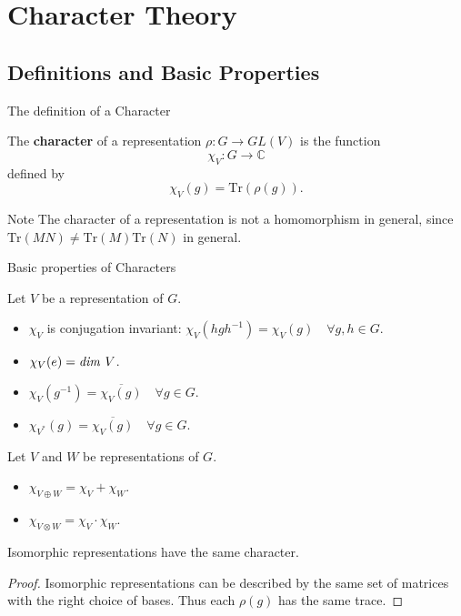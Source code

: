 \section{Character Theory}
\subsection{Definitions and Basic Properties}
\begin{frame}{The definition of a Character}
\begin{definition}
The \textbf{character} of a representation $\rho \colon G \to GL(V)$ is the function \[ \chi_V \colon G \to \mathbb{C}\] defined by \[\chi_V(g) = \text{Tr}(\rho(g)).\]
\end{definition}
\begin{block}{Note}
The character of a representation is not a homomorphism in general, since $\text{Tr}(MN) \neq \text{Tr}(M) \text{Tr}(N)$ in general.
\end{block}
\end{frame}

\begin{frame}{Basic properties of Characters}
\begin{proposition}
Let $V$ be a representation of $G$.
\begin{itemize}
\item $\chi_V$ is conjugation invariant: $\chi_V (h g h^{-1}) = \chi_V (g) \quad \forall g , h \in G$.
\item $\chi_V (e) = \text{\emph{dim }} V$.
\item \label{char-of-inverse} $\chi_V (g^{-1}) = \overline{\chi_V (g)} \quad \forall g \in G$.
\item $\chi_{V^*} (g) =  \overline{\chi_V (g)}\quad \forall g \in G$.
\end{itemize}
\end{proposition}
\begin{proposition}
Let $V$ and $W$ be representations of $G$.
\begin{itemize}
\item $\chi _{V \oplus W} = \chi_V + \chi_W$.
\item $\chi_{V \otimes W} = \chi_V \cdot \chi_W$.
\end{itemize}
\end{proposition}
\end{frame}

\begin{frame}
\begin{proposition}
Isomorphic representations have the same character.
\end{proposition}
\begin{proof}
Isomorphic representations can be described by the same set of matrices with the right choice of bases.  Thus each $\rho(g)$ has the same trace.
\end{proof}
\end{frame}


